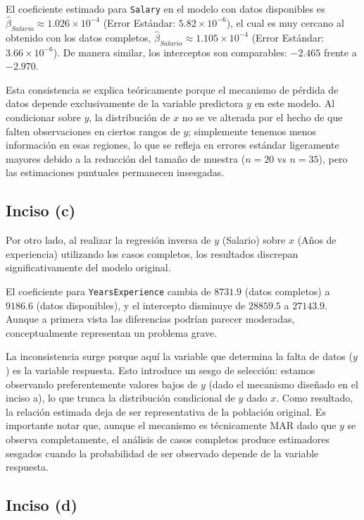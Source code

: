 \documentclass[paper=letter, fontsize=11pt, draft=false]{scrartcl}\usepackage[]{graphicx}\usepackage[]{xcolor}
\numberwithin{equation}{problemcounter} %
\numberwithin{figure}{problemcounter} %
\numberwithin{table}{problemcounter} %
\numberwithin{subsection}{problemcounter}
\begin{document}
El coeficiente estimado para \texttt{Salary} en el modelo con datos disponibles es $\hat{\beta}_{Salario} \approx 1.026 \times 10^{-4}$ (Error Estándar: $5.82 \times 10^{-6}$), el cual es muy cercano al obtenido con los datos completos, $\hat{\beta}_{Salario} \approx 1.105 \times 10^{-4}$ (Error Estándar: $3.66 \times 10^{-6}$). De manera similar, los interceptos son comparables: $-2.465$ frente a $-2.970$.

Esta consistencia se explica teóricamente porque el mecanismo de pérdida de datos depende exclusivamente de la variable predictora $y$ en este modelo. Al condicionar sobre $y$, la distribución de $x$ no se ve alterada por el hecho de que falten observaciones en ciertos rangos de $y$; simplemente tenemos menos información en esas regiones, lo que se refleja en errores estándar ligeramente mayores debido a la reducción del tamaño de muestra ($n=20$ vs $n=35$), pero las estimaciones puntuales permanecen insesgadas.

\subsection{Inciso (c)}
Por otro lado, al realizar la regresión inversa de $y$ (Salario) sobre $x$ (Años de experiencia) utilizando los casos completos, los resultados discrepan significativamente del modelo original.

El coeficiente para \texttt{YearsExperience} cambia de $8731.9$ (datos completos) a $9186.6$ (datos disponibles), y el intercepto disminuye de $28859.5$ a $27143.9$. Aunque a primera vista las diferencias podrían parecer moderadas, conceptualmente representan un problema grave.

La inconsistencia surge porque aquí la variable que determina la falta de datos ($y$) es la variable respuesta. Esto introduce un sesgo de selección: estamos observando preferentemente valores bajos de $y$ (dado el mecanismo diseñado en el inciso a), lo que trunca la distribución condicional de $y$ dado $x$. Como resultado, la relación estimada deja de ser representativa de la población original. Es importante notar que, aunque el mecanismo es técnicamente MAR  dado que $y$ se observa completamente, el análisis de casos completos produce estimadores sesgados cuando la probabilidad de ser observado depende de la variable respuesta.



\subsection{Inciso (d)}
\end{document}
